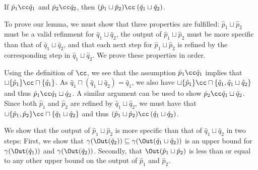 \begin{lemma} \label{lem:join-refine}
If $\hat p_{1} \cc \hat q_{1}$ and $\hat p_{2} \cc \hat q_{2}$, then $(\hat p_{1} \sqcup \hat p_{2}) \cc \: (\hat q_{1} \sqcup \hat q_{2})$.
\end{lemma}

To prove our lemma, we must show that three properties are fulfilled: $\hat p_{1} \sqcup \hat p_{2}$ must be a valid refinment for $\hat q_{1} \sqcup \hat q_{2}$, the output of $\hat p_{1} \sqcup \hat p_{2}$ must be more specific than that of $\hat q_{1} \sqcup \hat q_{2}$, and that each next step for $\hat p_{1} \sqcup \hat p_{2}$ is refined by the corresponding step in $\hat q_{1} \sqcup \hat q_{2}$. We prove these properties in order.

Using the definition of $\cc$, we see that the assumption $\hat p_{1} \cc \hat q_{1}$ implies that $\sqcup \{ \hat p_{1} \} \cc \sqcap \{ \hat q_{1} \}$. As $\hat q_{1} \sqcap (\hat q_{1} \sqcup \hat q_{2}) = \hat q_{1}$, we also have $\sqcup \{ \hat p_{1} \} \cc \sqcap \{ \hat q_{1}, \hat q_{1} \sqcup \hat q_{2} \}$ and thus $\hat p_{1} \cc \hat q_{1} \sqcup \hat q_{2}$. A similar argument can be used to show $\hat p_{2} \cc \hat q_{1} \sqcup \hat q_{2}$. Since both $\hat p_{1}$ and $\hat p_{2}$ are refined by $\hat q_{1} \sqcup \hat q_{2}$, we must have that $\sqcup \{ \hat p_{1}, \hat p_{2} \} \cc \sqcap \{ \hat q_{1} \sqcup \hat q_{2} \}$ and thus $(\hat p_{1} \sqcup \hat p_{2}) \cc \, (\hat q_{1} \sqcup \hat q_{2})$.


We show that the output of $\hat p_{1} \sqcup \hat p_{2}$ is more specific than that of $\hat q_{1} \sqcup \hat q_{2}$ in two steps: First, we show that $\gamma(\Out(\hat q_{2})) \sqsubseteq \gamma(\Out(\hat q_{1} \sqcup \hat q_{2}))$ is an upper bound for $\gamma(\Out(\hat q_{1}))$ and $\gamma(\Out(\hat q_{2}))$. Secondly, that $\Out(\hat p_{1} \sqcup \hat p_{2})$ is less than or equal to any other upper bound on the output of $\hat p_{1}$ and $\hat p_{2}$.


